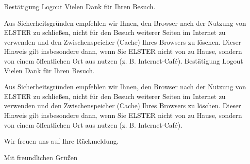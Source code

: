 \documentclass[11pt]{scrlttr2}
\begin{document}
\begin{letter}{}
        Bestätigung Logout
        Vielen Dank für Ihren Besuch.

        Aus Sicherheitsgründen empfehlen wir Ihnen, den Browser nach der Nutzung von ELSTER zu schließen, nicht für den Besuch weiterer Seiten im Internet zu verwenden und den Zwischenspeicher (Cache) Ihres Browsers zu löschen. Dieser Hinweis gilt insbesondere dann, wenn Sie ELSTER nicht von zu Hause, sondern von einem öffentlichen Ort aus nutzen (z. B. Internet-Café).
        Bestätigung Logout
        Vielen Dank für Ihren Besuch.

        Aus Sicherheitsgründen empfehlen wir Ihnen, den Browser nach der Nutzung von ELSTER zu schließen, nicht für den Besuch weiterer Seiten im Internet zu verwenden und den Zwischenspeicher (Cache) Ihres Browsers zu löschen. Dieser Hinweis gilt insbesondere dann, wenn Sie ELSTER nicht von zu Hause, sondern von einem öffentlichen Ort aus nutzen (z. B. Internet-Café).


        Wir freuen uns auf Ihre Rückmeldung.

        \closing{Mit freundlichen Grüßen}
        \signature{Ihr Name}

    \end{letter}
\end{document}
